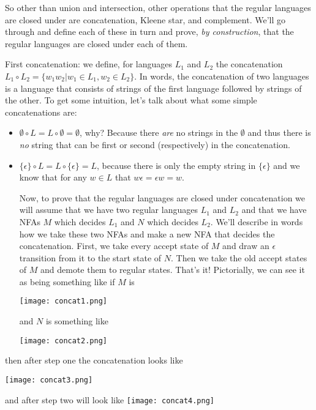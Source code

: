 \documentclass[11pt]{article}
\begin{document}
So other than union and intersection, other operations that the regular languages are closed under are concatenation, Kleene star, and complement. We'll go through and define each of these in turn and prove, \emph{by construction}, that the regular languages are closed under each of them.

First concatenation: we define, for languages $L_1$ and $L_2$ the concatenation $L_1 \circ L_2 = \{ w_1 w_2 | w_1 \in L_1, w_2 \in L_2\}$. In words, the concatenation of two languages is a language that consists of strings of the first language followed by strings of the other. To get some intuition, let's talk about what some simple concatenations are:
\begin{itemize}
\item $\emptyset \circ L = L \circ \emptyset = \emptyset$, why? Because there \emph{are} no strings in the $\emptyset$ and thus there is \emph{no} string that can be first or second (respectively) in the concatenation.
\item $\{ \epsilon \} \circ L = L \circ \{ \epsilon \} = L$, because there is only the empty string in $\{ \epsilon \}$ and we know that for any $w \in L$ that $w \epsilon = \epsilon w = w$.

Now, to prove that the regular languages are closed under concatenation we will assume that we have two regular languages $L_1$ and $L_2$ and that we have NFAs $M$ which decides $L_1$ and $N$ which decides $L_2$. We'll describe in words how we take these two NFAs and make a new NFA that decides the concatenation. First, we take every accept state of $M$ and draw an $\epsilon$ transition from it to the start state of $N$. Then we take the old accept states of $M$ and demote them to regular states. That's it! Pictorially, we can see it as being something like if $M$ is

\texttt{[image: concat1.png]}

and $N$ is something like

\texttt{[image: concat2.png]}
\end{itemize}


then after step one the concatenation looks like

\texttt{[image: concat3.png]}

and after step two will look like 
\texttt{[image: concat4.png]}
\end{document}
